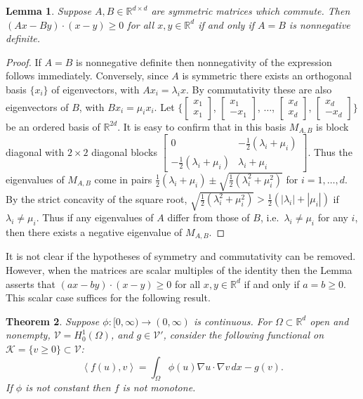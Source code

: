 \documentclass[letterpaper,final,12pt,reqno]{amsart}
\theoremstyle{cstyle}
\newtheorem{theorem}{Theorem}
\newtheorem{lemma}[theorem]{Lemma}
\theoremstyle{cstyle*}
\theoremstyle{dstyle}
\numberwithin{equation}{section}
\numberwithin{figure}{section}
\numberwithin{table}{section}
\numberwithin{theorem}{section}
\newcommand{\RR}{\mathbb{R}}
\newcommand{\grad}{\nabla}
\newcommand{\cK}{\mathcal{K}}
\newcommand{\cV}{\mathcal{V}}
\newcommand{\ip}[2]{\left<#1,#2\right>}
\begin{document}
\begin{lemma}  Suppose $A,B \in \RR^{d\times d}$ are symmetric matrices which commute.  Then $(Ax - By)\cdot (x-y)\ge 0$ for all $x,y\in \RR^d$ if and only if $A=B$ is nonnegative definite. \end{lemma}

\newcommand{\sbvec}[2]{\left[\begin{smallmatrix} #1 \\ #2 \end{smallmatrix}\right]}
\newcommand{\sbmat}[4]{\left[\begin{smallmatrix} #1 & #2 \\ #3 & #4 \end{smallmatrix}\right]}

\begin{proof}
If $A=B$ is nonnegative definite then nonnegativity of the expression follows immediately.  Conversely, since $A$ is symmetric there exists an orthogonal basis $\{x_i\}$ of eigenvectors, with $Ax_i = \lambda_i x$.  By commutativity these are also eigenvectors of $B$, with $Bx_i = \mu_i x_i$.  Let $\big\{\sbvec{x_1}{x_1}$, $\sbvec{x_1}{-x_1}$, $\dots$, $\sbvec{x_d}{x_d}$, $\sbvec{x_d}{-x_d}\big\}$ be an ordered basis of $\RR^{2d}$.  It is easy to confirm that in this basis $M_{A,B}$ is block diagonal with $2\times 2$ diagonal blocks $\sbmat{0}{-\frac{1}{2}(\lambda_i+\mu_i)}{-\frac{1}{2}(\lambda_i+\mu_i)}{\lambda_i+\mu_i}$.  Thus the eigenvalues of $M_{A,B}$ come in pairs $\frac{1}{2}(\lambda_i + \mu_i) \pm \sqrt{\frac{1}{2}(\lambda_i^2 + \mu_i^2)}$ for $i=1,\dots,d$.  By the strict concavity of the square root, $\sqrt{\frac{1}{2}(\lambda_i^2 + \mu_i^2)} > \frac{1}{2}(|\lambda_i| + |\mu_i|)$ if $\lambda_i\ne \mu_i$.  Thus if any eigenvalues of $A$ differ from those of $B$, i.e.~$\lambda_i\ne \mu_i$ for any $i$, then there exists a negative eigenvalue of $M_{A,B}$.
\end{proof}

It is not clear if the hypotheses of symmetry and commutativity can be removed.  However, when the matrices are scalar multiples of the identity then the Lemma asserts that $(ax-by)\cdot(x-y) \ge 0$ for all $x,y\in\RR^d$ if and only if $a=b\ge 0$.  This scalar case suffices for the following result.

\begin{theorem}
Suppose $\phi:[0,\infty) \to (0,\infty)$ is continuous.  For $\Omega \subset \RR^d$ open and nonempty, $\cV = H_0^1(\Omega)$, and $g\in \cV'$, consider the following functional on $\cK = \{v\ge 0\} \subset \cV$:
\begin{equation}
\ip{f(u)}{v} = \int_\Omega \phi(u) \grad u\cdot \grad v\,dx - g(v).  \label{eq:porousagain}
\end{equation}
If $\phi$ is not constant then $f$ is not monotone.
\end{theorem}
\end{document}
